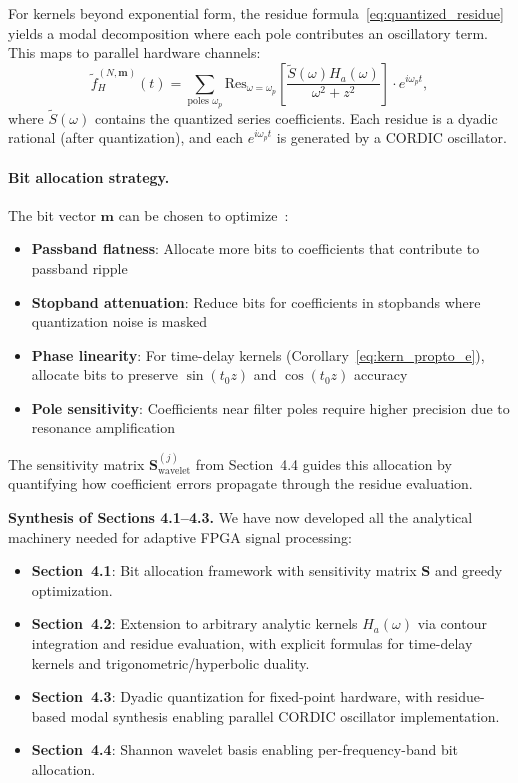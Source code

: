 For kernels beyond exponential form, the residue formula~\eqref{eq:quantized_residue} yields a modal decomposition where each pole contributes an oscillatory term. This maps to parallel hardware channels:
\begin{equation}
\widetilde{f}_H^{(N,\mathbf{m})}(t) = \sum_{\text{poles } \omega_p} \text{Res}_{\omega=\omega_p}\left[\frac{\widetilde{S}(\omega) H_a(\omega)}{\omega^2+z^2}\right] \cdot e^{i\omega_p t},
\label{eq:modal_synthesis}
\end{equation}
where $\widetilde{S}(\omega)$ contains the quantized series coefficients. Each residue is a dyadic rational (after quantization), and each $e^{i\omega_p t}$ is generated by a CORDIC oscillator.

\paragraph{Bit allocation strategy.} The bit vector $\mathbf{m}$ can be chosen to optimize~\cite{Parks1987, OppenheimSchafer2010}:
\begin{itemize}
\item \textbf{Passband flatness}: Allocate more bits to coefficients that contribute to passband ripple
\item \textbf{Stopband attenuation}: Reduce bits for coefficients in stopbands where quantization noise is masked
\item \textbf{Phase linearity}: For time-delay kernels (Corollary~\ref{eq:kern_propto_e}), allocate bits to preserve $\sin(t_0 z)$ and $\cos(t_0 z)$ accuracy
\item \textbf{Pole sensitivity}: Coefficients near filter poles require higher precision due to resonance amplification
\end{itemize}

The sensitivity matrix $\mathbf{S}_{\text{wavelet}}^{(j)}$ from Section~4.4 guides this allocation by quantifying how coefficient errors propagate through the residue evaluation.

\bigskip
\noindent\textbf{Synthesis of Sections 4.1--4.3.} We have now developed all the analytical machinery needed for adaptive FPGA signal processing:
\begin{itemize}
\item \textbf{Section~4.1}: Bit allocation framework with sensitivity matrix $\mathbf{S}$ and greedy optimization.
\item \textbf{Section~4.2}: Extension to arbitrary analytic kernels $H_a(\omega)$ via contour integration and residue evaluation, with explicit formulas for time-delay kernels and trigonometric/hyperbolic duality.
\item \textbf{Section~4.3}: Dyadic quantization for fixed-point hardware, with residue-based modal synthesis enabling parallel CORDIC oscillator implementation.
\item \textbf{Section~4.4}: Shannon wavelet basis enabling per-frequency-band bit allocation.
\end{itemize}

